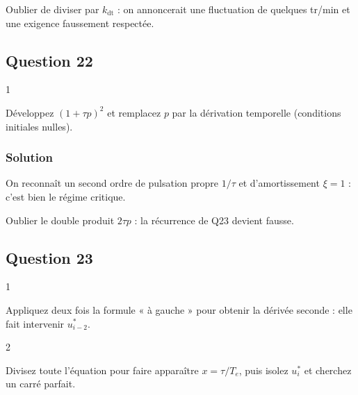 \documentclass[11pt,a4paper]{article}
\newcommand{\equationajustee}[1]{%
  \sbox{\boiteequation}{$\displaystyle #1$}%
  \ifdim\wd\boiteequation>\linewidth
    \[\resizebox{\linewidth}{!}{\usebox{\boiteequation}}\]%
  \else
    \[#1\]%
  \fi}
\begin{document}
\begin{piege}

Oublier de diviser par \(k_{\text{dt}}\) : on annoncerait une fluctuation de quelques tr/min et une exigence faussement respectée.

\end{piege}

\hypertarget{question-22}{%
\subsection{Question 22}\label{question-22}}

\begin{indication}{1}

Développez \((1+\tau p)^2\) et remplacez \(p\) par la dérivation temporelle (conditions initiales nulles).

\end{indication}

\hypertarget{solution-21}{%
\subsubsection{Solution}\label{solution-21}}

\equationajustee{\boxed{\tau^2\,\ddot u^*+2\tau\,\dot u^*+u^*=u}.}

On reconnaît un second ordre de pulsation propre \(1/\tau\) et d'amortissement \(\xi=1\) : c'est bien le régime critique.

\begin{piege}

Oublier le double produit \(2\tau p\) : la récurrence de Q23 devient fausse.

\end{piege}

\hypertarget{question-23}{%
\subsection{Question 23}\label{question-23}}

\begin{indication}{1}

Appliquez deux fois la formule « à gauche » pour obtenir la dérivée seconde : elle fait intervenir \(u^*_{i-2}\).

\end{indication}

\begin{indication}{2}

Divisez toute l'équation pour faire apparaître \(x=\tau/T_e\), puis isolez \(u^*_i\) et cherchez un carré parfait.

\end{indication}
\end{document}
